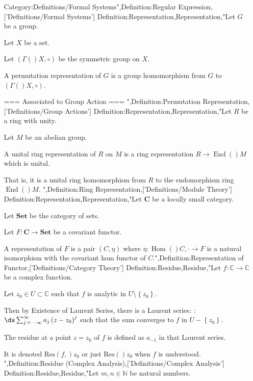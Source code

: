 Category:Definitions/Formal Systems",Definition:Regular Expression,['Definitions/Formal Systems']
Definition:Representation,Representation,"Let $G$ be a group.

Let $X$ be a set.

Let $\left( \Gamma \left(   \right)X, \circ \right)$ be the symmetric group on $X$.


A permutation representation of $G$ is a group homomorphism from $G$ to $\left( \Gamma \left(   \right)X, \circ \right)$.


=== Associated to Group Action ===
",Definition:Permutation Representation,['Definitions/Group Actions']
Definition:Representation,Representation,"Let $R$ be a ring with unity.

Let $M$ be an abelian group.


A unital ring representation of $R$ on $M$ is a ring representation $R \to \operatorname {End}  \left(   \right)M$ which is unital.

That is, it is a unital ring homomorphism from $R$ to the endomorphism ring $\operatorname {End}  \left(   \right)M$.
",Definition:Ring Representation,['Definitions/Module Theory']
Definition:Representation,Representation,"Let $\mathbf C$ be a locally small category.

Let $\mathbf{Set}$ be the category of sets.

Let $F : \mathbf C \to \mathbf{Set}$ be a covariant functor.


A representation of $F$ is a pair $\left( C, \eta \right)$ where $\eta : \operatorname {Hom}  \left(   \right){C, \cdot} \to F$ is a natural isomorphism with the covariant hom functor of $C$.",Definition:Representation of Functor,['Definitions/Category Theory']
Definition:Residue,Residue,"Let $f: \mathbb C \to \mathbb C$ be a complex function.

Let $z_0 \in U \subset \mathbb C$ such that $f$ is analytic in $U \setminus \left\lbrace z_0 \right\rbrace$.


Then by Existence of Laurent Series, there is a Laurent series:
:$\ds \sum_{j \mathop = -\infty}^\infty a_j \left( z - z_0 \right)^j$
such that the sum converges to $f$ in $U - \left\lbrace z_0 \right\rbrace$.  


The residue at a point $z = z_0$ of $f$ is defined as $a_{-1}$ in that Laurent series.

It is denoted $\mathrm {Res} \left( f,   \right){z_0}$ or just $\mathrm {Res}  \left(   \right){z_0}$ when $f$ is understood.
",Definition:Residue (Complex Analysis),['Definitions/Complex Analysis']
Definition:Residue,Residue,"Let $m, n \in \mathbb N$ be natural numbers.

